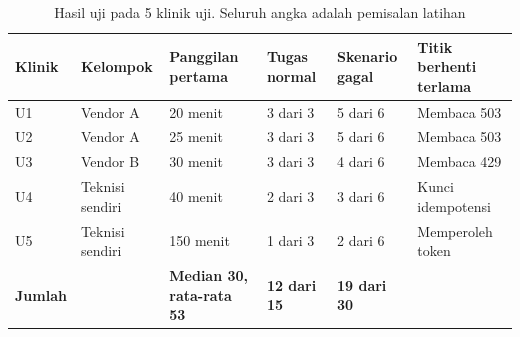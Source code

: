 \begin{table}[!htb]
  \centering
  \caption{Hasil uji pada 5 klinik uji. Seluruh angka adalah pemisalan latihan}
  \label{tab:ch11-lima-klinik}
  \footnotesize
  \begin{tabularx}{\textwidth}{H{1.05cm}H{2.1cm}H{1.75cm}H{1.55cm}H{1.55cm}G}
    \hline
    \textbf{Klinik} & \textbf{Kelompok} & \textbf{Panggilan pertama} & \textbf{Tugas normal} & \textbf{Skenario gagal} & \textbf{Titik berhenti terlama} \\ \hline
    U1 & Vendor A & 20 menit & 3 dari 3 & 5 dari 6 & Membaca 503 \\ \hline
    U2 & Vendor A & 25 menit & 3 dari 3 & 5 dari 6 & Membaca 503 \\ \hline
    U3 & Vendor B & 30 menit & 3 dari 3 & 4 dari 6 & Membaca 429 \\ \hline
    U4 & Teknisi sendiri & 40 menit & 2 dari 3 & 3 dari 6 & Kunci idempotensi \\ \hline
    U5 & Teknisi sendiri & 150 menit & 1 dari 3 & 2 dari 6 & Memperoleh token \\ \hline
    \textbf{Jumlah} & & \textbf{Median 30, rata-rata 53} & \textbf{12 dari 15} & \textbf{19 dari 30} & \\ \hline
  \end{tabularx}
\end{table}

